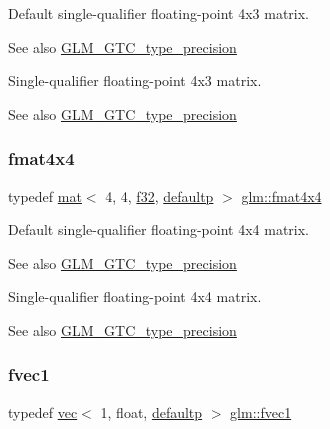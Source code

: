 Default single-\/qualifier floating-\/point 4x3 matrix. \begin{DoxySeeAlso}{See also}
\mbox{\hyperlink{group__gtc__type__precision}{G\+L\+M\+\_\+\+G\+T\+C\+\_\+type\+\_\+precision}}
\end{DoxySeeAlso}
Single-\/qualifier floating-\/point 4x3 matrix. \begin{DoxySeeAlso}{See also}
\mbox{\hyperlink{group__gtc__type__precision}{G\+L\+M\+\_\+\+G\+T\+C\+\_\+type\+\_\+precision}} 
\end{DoxySeeAlso}
\mbox{\label{group__gtc__type__precision_gaeda4baa9a8e3113ff879dd5e7bdf5334}} 
\subsubsection{\texorpdfstring{fmat4x4}{fmat4x4}}
{\footnotesize\ttfamily typedef \mbox{\hyperlink{structglm_1_1mat}{mat}}$<$ 4, 4, \mbox{\hyperlink{group__gtc__type__precision_ga0ec999b57f5330d9021256e96038df04}{f32}}, \mbox{\hyperlink{namespaceglm_a36ed105b07c7746804d7fdc7cc90ff25a9d21ccd8b5a009ec7eb7677befc3bf51}{defaultp}} $>$ \mbox{\hyperlink{group__gtc__type__precision_gaeda4baa9a8e3113ff879dd5e7bdf5334}{glm\+::fmat4x4}}}

Default single-\/qualifier floating-\/point 4x4 matrix. \begin{DoxySeeAlso}{See also}
\mbox{\hyperlink{group__gtc__type__precision}{G\+L\+M\+\_\+\+G\+T\+C\+\_\+type\+\_\+precision}}
\end{DoxySeeAlso}
Single-\/qualifier floating-\/point 4x4 matrix. \begin{DoxySeeAlso}{See also}
\mbox{\hyperlink{group__gtc__type__precision}{G\+L\+M\+\_\+\+G\+T\+C\+\_\+type\+\_\+precision}} 
\end{DoxySeeAlso}
\mbox{\label{group__gtc__type__precision_gaed54853d0f184df0e5fbd9f9118c477b}} 
\subsubsection{\texorpdfstring{fvec1}{fvec1}}
{\footnotesize\ttfamily typedef \mbox{\hyperlink{structglm_1_1vec}{vec}}$<$ 1, float, \mbox{\hyperlink{namespaceglm_a36ed105b07c7746804d7fdc7cc90ff25a9d21ccd8b5a009ec7eb7677befc3bf51}{defaultp}} $>$ \mbox{\hyperlink{group__gtc__type__precision_gaed54853d0f184df0e5fbd9f9118c477b}{glm\+::fvec1}}}

